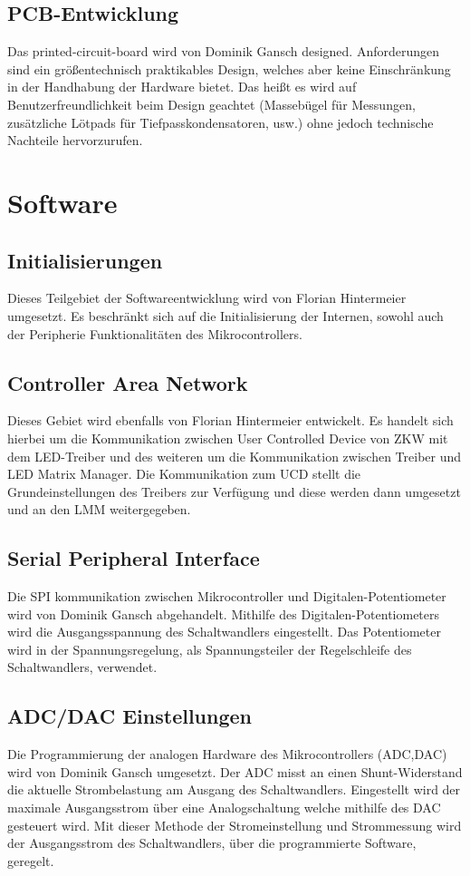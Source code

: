 \documentclass[paper=a4, 12pt]{scrreprt}
\begin{document}
        \subsection{PCB-Entwicklung}\hfill \break
        Das printed-circuit-board wird von Dominik Gansch designed. Anforderungen sind ein größentechnisch praktikables Design, welches aber keine Einschränkung in der Handhabung der Hardware bietet. Das heißt es wird auf Benutzerfreundlichkeit beim Design geachtet (Massebügel für Messungen, zusätzliche Lötpads für Tiefpasskondensatoren, usw.) ohne jedoch technische Nachteile hervorzurufen.
        \newpage
   \section{Software}\hfill \break
   		\subsection{Initialisierungen}\hfill \break
   		Dieses Teilgebiet der Softwareentwicklung wird von Florian Hintermeier umgesetzt. Es beschränkt sich auf die Initialisierung der Internen, sowohl auch der Peripherie Funktionalitäten des Mikrocontrollers.
   		\subsection{Controller Area Network}\hfill \break
   		Dieses Gebiet wird ebenfalls von Florian Hintermeier entwickelt. Es handelt sich hierbei um die Kommunikation zwischen User Controlled Device von ZKW mit dem LED-Treiber und des weiteren um die Kommunikation zwischen Treiber und LED Matrix Manager.
   		Die Kommunikation zum UCD stellt die Grundeinstellungen des Treibers zur Verfügung und diese werden dann umgesetzt und an den LMM weitergegeben.
   		\subsection{Serial Peripheral Interface}\hfill \break
    	Die SPI kommunikation zwischen Mikrocontroller und Digitalen-Potentiometer wird von Dominik Gansch abgehandelt. Mithilfe des Digitalen-Potentiometers wird die Ausgangsspannung des Schaltwandlers eingestellt. Das Potentiometer wird in der Spannungsregelung, als Spannungsteiler der Regelschleife des Schaltwandlers, verwendet.
    	\subsection{ADC/DAC Einstellungen}\hfill \break
    	Die Programmierung der analogen Hardware des Mikrocontrollers (ADC,DAC) wird von Dominik Gansch umgesetzt. Der ADC misst an einen Shunt-Widerstand die aktuelle Strombelastung am Ausgang des Schaltwandlers. Eingestellt wird der maximale Ausgangsstrom über eine Analogschaltung welche mithilfe des DAC gesteuert wird.
    	Mit dieser Methode der Stromeinstellung und Strommessung wird der Ausgangsstrom des Schaltwandlers, über die programmierte Software, geregelt.
\end{document}
